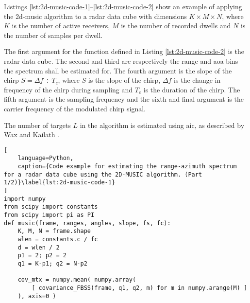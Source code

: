 Listings \ref{lst:2d-music-code-1}--\ref{lst:2d-music-code-2} show an example of applying the \gls{2d-music} algorithm to a radar data cube
with dimensions $K \times M \times N$, where $K$ is the number of active receivers, 
$M$ is the number of recorded dwells and $N$ is the number of samples per dwell.

The first argument for the function defined in Listing \ref{lst:2d-music-code-2} is the radar data cube.
The second and third are respectively the range and \gls{aoa} bins the spectrum shall be estimated for.
The fourth argument is the slope of the chirp $S = \Delta f \div T_c$, where $S$ is the slope of the chirp,
$\Delta f$ is the change in frequency of the chirp during sampling and $T_c$ is the duration of the chirp.
The fifth argument is the sampling frequency and the sixth and final argument is the carrier frequency of the modulated chirp signal.

The number of targets $L$ in the algorithm is estimated using \gls{aic}, as described by Wax and Kailath \cite{wax-kailath-85}.

\begin{lstlisting}[
    language=Python,
    caption={Code example for estimating the range-azimuth spectrum for a radar data cube using the 2D-MUSIC algorithm. (Part 1/2)}\label{lst:2d-music-code-1}
]
import numpy
from scipy import constants
from scipy import pi as PI
def music(frame, ranges, angles, slope, fs, fc):
    K, M, N = frame.shape
    wlen = constants.c / fc
    d = wlen / 2
    p1 = 2; p2 = 2
    q1 = K-p1; q2 = N-p2

    cov_mtx = numpy.mean( numpy.array(
        [ covariance_FBSS(frame, q1, q2, m) for m in numpy.arange(M) ]
    ), axis=0 )
\end{lstlisting}
\newpage


